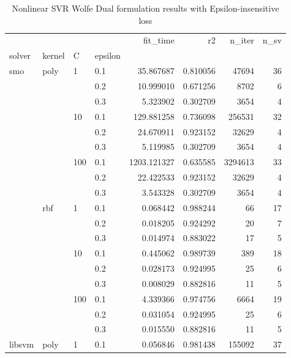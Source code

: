 \begin{table}[H]
\centering
\caption{Nonlinear SVR Wolfe Dual formulation results with Epsilon-insensitive loss}
\label{nonlinear_dual_l1_svr_cv_results}
\begin{tabular}{llllrrrr}
\toprule
       &     &     &     &     fit\_time &        r2 &    n\_iter &  n\_sv \\
solver & kernel & C & epsilon &              &           &           &       \\
\midrule
smo & poly & 1   & 0.1 &    35.867687 &  0.810056 &     47694 &    36 \\
       &     &     & 0.2 &    10.999010 &  0.671256 &      8702 &     6 \\
       &     &     & 0.3 &     5.323902 &  0.302709 &      3654 &     4 \\
       &     & 10  & 0.1 &   129.881258 &  0.736098 &    256531 &    32 \\
       &     &     & 0.2 &    24.670911 &  0.923152 &     32629 &     4 \\
       &     &     & 0.3 &     5.119985 &  0.302709 &      3654 &     4 \\
       &     & 100 & 0.1 &  1203.121327 &  0.635585 &   3294613 &    33 \\
       &     &     & 0.2 &    22.422533 &  0.923152 &     32629 &     4 \\
       &     &     & 0.3 &     3.543328 &  0.302709 &      3654 &     4 \\
       & rbf & 1   & 0.1 &     0.068442 &  0.988244 &        66 &    17 \\
       &     &     & 0.2 &     0.018205 &  0.924292 &        20 &     7 \\
       &     &     & 0.3 &     0.014974 &  0.883022 &        17 &     5 \\
       &     & 10  & 0.1 &     0.445062 &  0.989739 &       389 &    18 \\
       &     &     & 0.2 &     0.028173 &  0.924995 &        25 &     6 \\
       &     &     & 0.3 &     0.008029 &  0.882816 &        11 &     5 \\
       &     & 100 & 0.1 &     4.339366 &  0.974756 &      6664 &    19 \\
       &     &     & 0.2 &     0.031054 &  0.924995 &        25 &     6 \\
       &     &     & 0.3 &     0.015550 &  0.882816 &        11 &     5 \\
libsvm & poly & 1   & 0.1 &     0.056846 &  0.981438 &    155092 &    37 \\

\end{tabular}
\end{table}
